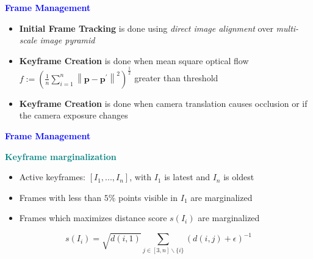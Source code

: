 \documentclass[aspectratio=169]{beamer}
\begin{document}
\begin{frame}{\textcolor{blue}{\textbf{Frame Management}}}
	\vspace{-0.5cm}
	\begin{itemize}
			\item \textbf{Initial Frame Tracking} is done using \textit{direct image alignment} over \textit{multi-scale image pyramid}
			\item \textbf{Keyframe Creation} is done when mean square  optical flow $f:=\left(\frac{1}{n} \sum_{i=1}^n\left\|\mathbf{p}-\mathbf{p}^{\prime}\right\|^2\right)^{\frac{1}{2}}$ greater than threshold
			\item \textbf{Keyframe Creation} is done when camera translation causes occlusion or if the camera exposure changes 
	\end{itemize}

\end{frame}


\begin{frame}{\textcolor{blue}{\textbf{Frame Management}}}
	\vspace{-0.5cm}
	\begin{block}{\textbf{\textcolor{teal}{Keyframe marginalization}}}
	\begin{itemize}
			\item Active keyframes: $\left[I_1, ..., I_n\right]$, with $I_1$ is latest and $I_n$ is oldest
			\item Frames with less than $5\%$ points visible in $I_1$ are marginalized
			\item Frames which maximizes distance score $s(I_i)$ are marginalized
	\end{itemize}
	\end{block}

	\begin{equation}
		s\left(I_i\right)=\sqrt{d(i, 1)} \sum_{j \in[3, n] \backslash\{i\}}(d(i, j)+\epsilon)^{-1}
	\end{equation}

\end{frame}
\end{document}
